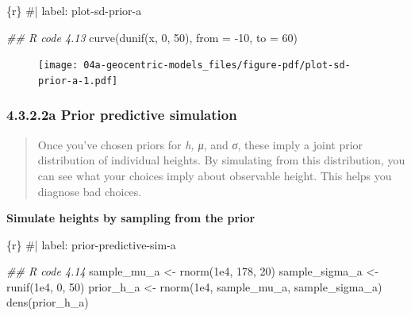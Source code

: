 \documentclass[
  letterpaper,
  DIV=11,
  numbers=noendperiod]{scrreprt}
\newenvironment{Shaded}{\begin{snugshade}}{\end{snugshade}}
\newcommand{\AttributeTok}[1]{\textcolor[rgb]{0.40,0.45,0.13}{#1}}
\newcommand{\CommentTok}[1]{\textcolor[rgb]{0.37,0.37,0.37}{#1}}
\newcommand{\DecValTok}[1]{\textcolor[rgb]{0.68,0.00,0.00}{#1}}
\newcommand{\DocumentationTok}[1]{\textcolor[rgb]{0.37,0.37,0.37}{\textit{#1}}}
\newcommand{\FloatTok}[1]{\textcolor[rgb]{0.68,0.00,0.00}{#1}}
\newcommand{\FunctionTok}[1]{\textcolor[rgb]{0.28,0.35,0.67}{#1}}
\newcommand{\InformationTok}[1]{\textcolor[rgb]{0.37,0.37,0.37}{#1}}
\newcommand{\NormalTok}[1]{\textcolor[rgb]{0.00,0.23,0.31}{#1}}
\newcommand{\OtherTok}[1]{\textcolor[rgb]{0.00,0.23,0.31}{#1}}
\newcommand{\SpecialCharTok}[1]{\textcolor[rgb]{0.37,0.37,0.37}{#1}}
\begin{document}
\begin{Shaded}
\begin{Highlighting}[]
\InformationTok{\textasciigrave{}\textasciigrave{}\textasciigrave{}\{r\}}
\CommentTok{\#| label: plot{-}sd{-}prior{-}a}

\DocumentationTok{\#\# R code 4.13}
\FunctionTok{curve}\NormalTok{(}\FunctionTok{dunif}\NormalTok{(x, }\DecValTok{0}\NormalTok{, }\DecValTok{50}\NormalTok{), }\AttributeTok{from =} \SpecialCharTok{{-}}\DecValTok{10}\NormalTok{, }\AttributeTok{to =} \DecValTok{60}\NormalTok{)}
\InformationTok{\textasciigrave{}\textasciigrave{}\textasciigrave{}}
\end{Highlighting}
\end{Shaded}

\begin{figure}[H]

{\centering \texttt{[image: 04a-geocentric-models\_files/figure-pdf/plot-sd-prior-a-1.pdf]}

}

\end{figure}

\hypertarget{a-prior-predictive-simulation}{%
\subsubsection{4.3.2.2a Prior predictive
simulation}\label{a-prior-predictive-simulation}}

\begin{quote}
Once you've chosen priors for \emph{h, μ}, and \emph{σ}, these imply a
joint prior distribution of individual heights. By simulating from this
distribution, you can see what your choices imply about observable
height. This helps you diagnose bad choices.
\end{quote}

\textbf{Simulate heights by sampling from the prior}

\begin{Shaded}
\begin{Highlighting}[]
\InformationTok{\textasciigrave{}\textasciigrave{}\textasciigrave{}\{r\}}
\CommentTok{\#| label: prior{-}predictive{-}sim{-}a}

\DocumentationTok{\#\# R code 4.14}
\NormalTok{sample\_mu\_a }\OtherTok{\textless{}{-}} \FunctionTok{rnorm}\NormalTok{(}\FloatTok{1e4}\NormalTok{, }\DecValTok{178}\NormalTok{, }\DecValTok{20}\NormalTok{)}
\NormalTok{sample\_sigma\_a }\OtherTok{\textless{}{-}} \FunctionTok{runif}\NormalTok{(}\FloatTok{1e4}\NormalTok{, }\DecValTok{0}\NormalTok{, }\DecValTok{50}\NormalTok{)}
\NormalTok{prior\_h\_a }\OtherTok{\textless{}{-}} \FunctionTok{rnorm}\NormalTok{(}\FloatTok{1e4}\NormalTok{, sample\_mu\_a, sample\_sigma\_a)}
\FunctionTok{dens}\NormalTok{(prior\_h\_a)}
\InformationTok{\textasciigrave{}\textasciigrave{}\textasciigrave{}}
\end{Highlighting}
\end{Shaded}
\end{document}
